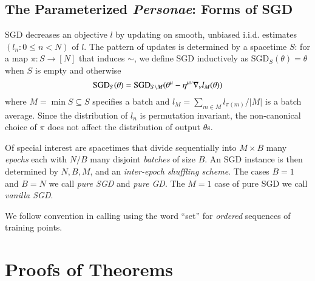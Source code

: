 \documentclass{article}
\theoremstyle{plain}
\theoremstyle{definition}
\newcommand{\SGD}{\text{\textnormal{SGD}}}
\newcommand{\wabs}[1]{\left|#1\right|}
\begin{document}
    \subsection{The Parameterized \emph{Personae}: Forms of SGD}
        SGD decreases an objective $l$ by updating on smooth, unbiased i.i.d.
        estimates $(l_n: 0\leq n<N)$ of $l$.  The pattern of updates is
        determined by a spacetime $S$: for a map
        $\pi:S\to [N]$ that induces $\sim$, we define SGD inductively as
        $\text{SGD}_{S}(\theta) = \theta$ when $S$ is empty and otherwise
        $$
            \SGD_S(\theta)
            =
            \SGD_{S\setminus M}(
                \theta^\mu - \eta^{\mu\nu} \nabla_\nu l_{M}(\theta)
            )
        $$
        where $M = \min S \subseteq S$ specifies a batch and $l_M = \sum_{m\in
        M} l_{\pi(m)} / \wabs{M}$ is a batch average.  Since the distribution
        of $l_n$ is permutation invariant, the non-canonical choice of $\pi$
        does not affect the distribution of output $\theta$s.
    
        Of special interest are spacetimes that divide sequentially into
        $M\times B$ many \emph{epochs} each with $N/B$ many disjoint
        \emph{batches} of size $B$.  An SGD instance is then determined by $N,
        B, M$, and an \emph{inter-epoch shuffling scheme}.  The cases $B=1$ and
        $B=N$ we call \emph{pure SGD} and \emph{pure GD}.  The $M=1$ case of
        pure SGD we call \emph{vanilla SGD}.

        We follow convention in calling using the word ``set'' for
        \emph{ordered} sequences of training points. 

\section{Proofs of Theorems} \label{sect:proofs}
   
\end{document}
